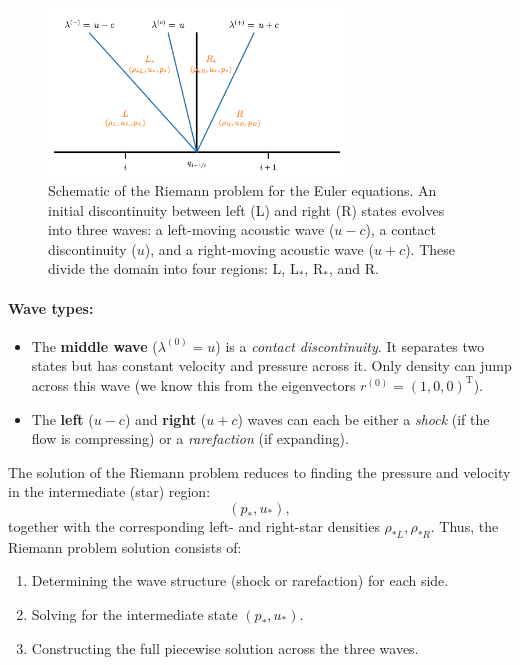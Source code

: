 \documentclass{article}
\begin{document}
\begin{figure}[h]
    \centering
    \includegraphics[width=0.7\textwidth]{figures/riemann-problem.png}
    \caption{Schematic of the Riemann problem for the Euler equations. 
    An initial discontinuity between left (L) and right (R) states evolves 
    into three waves: a left-moving acoustic wave ($u-c$), a contact 
    discontinuity ($u$), and a right-moving acoustic wave ($u+c$). 
    These divide the domain into four regions: L, L$_*$, R$_*$, and R.}
    \label{fig:riemann-problem}
\end{figure}


\paragraph{Wave types:}
\begin{itemize}
  \item The \textbf{middle wave} ($\lambda^{(0)} = u$) is a \emph{contact discontinuity}.  
        It separates two states but has constant velocity and pressure across it.  
        Only density can jump across this wave (we know this from the eigenvectors $r^{(0)}=(1,0,0)^\mathrm{T}$).
  \item The \textbf{left} ($u-c$) and \textbf{right} ($u+c$) waves can each be either
        a \emph{shock} (if the flow is compressing) or a \emph{rarefaction} (if expanding).
\end{itemize}
The solution of the Riemann problem reduces to finding the pressure and velocity
in the intermediate (star) region:
\[
(p_*, u_*),
\]
together with the corresponding left- and right-star densities $\rho_{*L}, \rho_{*R}$. Thus, the Riemann problem solution consists of:
\begin{enumerate}
  \item Determining the wave structure (shock or rarefaction) for each side.
  \item Solving for the intermediate state $(p_*, u_*)$.
  \item Constructing the full piecewise solution across the three waves.
\end{enumerate}
\end{document}
